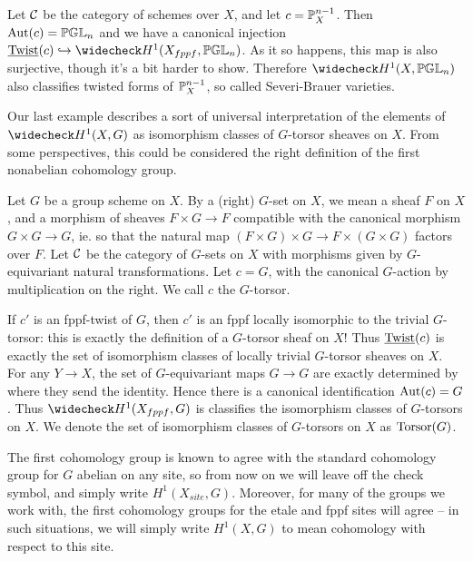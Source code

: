\begin{ex}
Let $\mathcal{C}$ be the category of schemes over $X$, and let $c = \mathbb{P}^{n-1}_X$.  Then $\textnormal{Aut}(c) = \mathbb{PGL}_n$ and we have a canonical injection $\twist(c)\hookrightarrow \wc{H}^1(X_{fppf},\bbpgl_n)$.  As it so happens, this map is also surjective, though it's a bit harder to show.  Therefore $\wc{H}^1(X,\bbpgl_n)$ also classifies twisted forms of $\mathbb{P}^{n-1}_X$, so called Severi-Brauer varieties.
\end{ex}

Our last example describes a sort of universal interpretation of the elements of $\wc{H}^1(X,G)$ as isomorphism classes of $G$-torsor sheaves on $X$.  From some perspectives, this could be considered the right definition of the first nonabelian cohomology group.
\begin{ex}
Let $G$ be a group scheme on $X$.  By a (right) $G$-set on $X$, we mean a sheaf $F$ on $X$, and a morphism of sheaves $F\times G\rightarrow F$ compatible with the canonical morphism $G\times G\rightarrow G$, ie. so that the natural map $(F\times G)\times G\rightarrow F\times (G\times G)$ factors over $F$.  Let $\mathcal{C}$ be the category of $G$-sets on $X$ with morphisms given by $G$-equivariant natural transformations.  Let $c=G$, with the canonical $G$-action by multiplication on the right.  We call $c$ the  $G$-torsor.

If $c'$ is an fppf-twist of $G$, then $c'$ is an fppf locally isomorphic to the trivial $G$-torsor: this is exactly the definition of a $G$-torsor sheaf on $X$!  Thus $\textnormal{\underline{Twist}}(c)$ is exactly the set of isomorphism classes of locally trivial $G$-torsor sheaves on $X$.  For any $Y\rightarrow X$, the set of $G$-equivariant maps $G\rightarrow G$ are exactly determined by where they send the identity.  Hence there is a canonical identification $\textnormal{Aut}(c) = G$.  Thus $\wc H^1(X_{fppf},G)$ is classifies the isomorphism classes of $G$-torsors on $X$.  We denote the set of isomorphism classes of $G$-torsors on $X$ as $\textnormal{Torsor}(G)$.
\end{ex}

\begin{remk}
The first cohomology group is known to agree with the standard cohomology group for $G$ abelian on any site, so from now on we will leave off the check symbol, and simply write $H^1(X_{site},G)$.  Moreover, for many of the groups we work with, the first cohomology groups for the etale and fppf sites will agree -- in such situations, we will simply write $H^1(X,G)$ to mean cohomology with respect to this site.
\end{remk}

